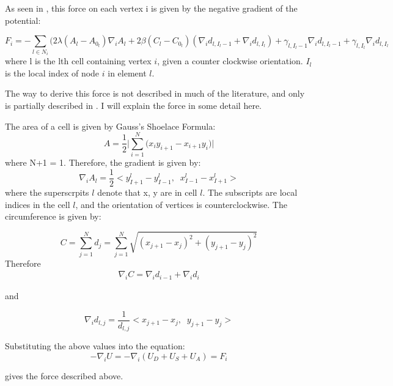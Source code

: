  As seen in \cite{ChasteMain}, this force on each vertex i is given by the negative gradient of the potential:

\begin{equation}
F_i = -\displaystyle\sum_{l\in N_i}(2\lambda(A_l - A_{0_l})\nabla_iA_l + 2\beta(C_l - C_{0_l})(\nabla_i d_{l, I_l-1}+\nabla_i d_{l, I_l}) + \gamma_{l, I_l-1}\nabla_i d_{l, I_l-1} + \gamma_{l, I_l}\nabla_i d_{l, I_l}
\end{equation} 
where l is the lth cell containing vertex $i$, given a counter clockwise orientation. $I_l$ is the local index of node $i$ in element $l$.

The way to derive this force is not described in much of the literature, and only is partially described in \cite{Chaste Main}. I will explain the force in some detail here.

 The area of a cell is given by Gauss's Shoelace Formula:
\begin{equation}
A = \frac12\Big|\sum\limits_{i=1}^N\Big(x_iy_{i+1}-x_{i+1}y_i\Big)\Big|
\end{equation}
where N+1 = 1. Therefore, the gradient is given by:
\begin{equation}
\nabla_i A_l = \frac12
\Big<
y^l_{I+1} - y^l_{I-1},\;\;x^l_{I-1} - x^l_{I+1}
\Big>
\end{equation}
 where the superscrpits $l$ denote that x, y are in cell $l$. The subscripts are local indices in the cell $l$, and the orientation of vertices is counterclockwise. The circumference is given by:

\begin{equation}
C = \sum\limits_{j=1}^Nd_j = \sum\limits_{j=1}^N\sqrt{(x_{j+1} - x_j)^2 + (y_{j+1} - y_j)^2}
\end{equation}
Therefore
\begin{gather}
\nabla_iC = \nabla_id_{i-1} + \nabla_id_i
\end{gather}

and

\begin{equation}
\nabla_id_{l, j} = \frac1{d_{l, j}}
\Big<
x_{j+1}- x_j,\;\; y_{j+1} - y_j
\Big>
\end{equation}

Substituting the above values into the equation:
\begin{equation}
-\nabla_iU = -\nabla_i(U_D + U_S + U_A) = F_i
\end{equation}

gives the force described above.

